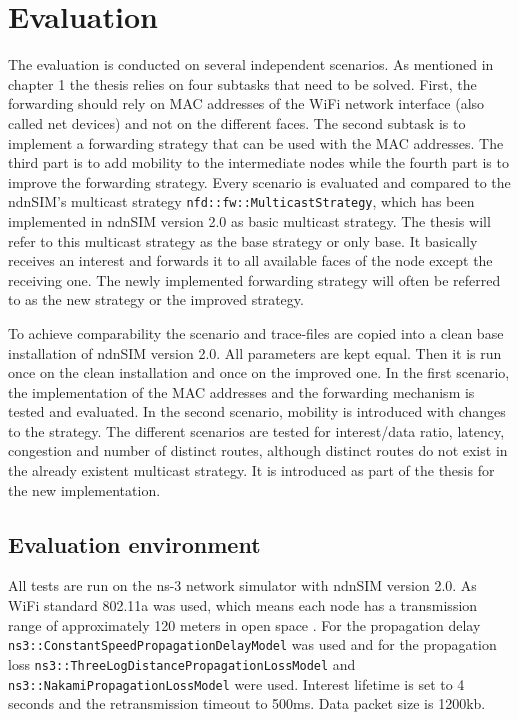 \chapter{Evaluation}

The evaluation is conducted on several independent scenarios. As mentioned in chapter 1 the thesis relies on four subtasks that need to be solved. First, the forwarding should rely on MAC addresses of the WiFi network interface (also called net devices) and not on the different faces. The second subtask is to implement a forwarding strategy that can be used with the MAC addresses. The third part is to add mobility to the intermediate nodes while the fourth part is to improve the forwarding strategy. Every scenario is evaluated and compared to the ndnSIM's multicast strategy \texttt{nfd::fw::MulticastStrategy}, which has been implemented in ndnSIM version 2.0 as basic multicast strategy. The thesis will refer to this multicast strategy as the base strategy or only base. It basically receives an interest and forwards it to all available faces of the node except the receiving one. The newly implemented forwarding strategy will often be referred to as the new strategy or the improved strategy.

To achieve comparability the scenario and trace-files are copied into a clean base installation of ndnSIM version 2.0. All parameters are kept equal. Then it is run once on the clean installation and once on the improved one. In the first scenario, the implementation of the MAC addresses and the forwarding mechanism is tested and evaluated. In the second scenario, mobility is introduced with changes to the strategy. The different scenarios are tested for interest/data ratio, latency, congestion and number of distinct routes, although distinct routes do not exist in the already existent multicast strategy. It is introduced as part of the thesis for the new implementation.

\section{Evaluation environment}

All tests are run on the ns-3 network simulator with ndnSIM version 2.0.  As WiFi standard 802.11a was used, which means each node has a transmission range of approximately 120 meters in open space \cite{wifi80211a} . For the propagation delay \texttt{ns3::ConstantSpeedPropagationDelayModel} was used and for the propagation loss \texttt{ns3::ThreeLogDistancePropagationLossModel} and \texttt{ns3::NakamiPropagationLossModel} were used. Interest lifetime is set to 4 seconds and the retransmission timeout to 500ms. Data packet size is 1200kb.

